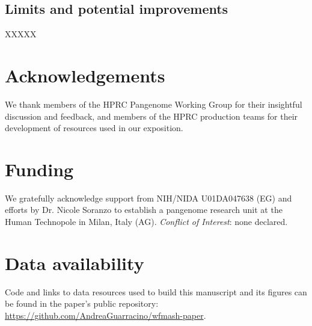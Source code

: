 \documentclass{bioinfo}
\theoremstyle{definition}
\begin{document}
\subsection{Limits and potential improvements}

XXXXX

\section*{Acknowledgements}

We thank members of the HPRC Pangenome Working Group for their insightful discussion and feedback, and members of the HPRC production teams for their development of resources used in our exposition.

\section*{Funding}

We gratefully acknowledge support from NIH/NIDA U01DA047638 (EG) and efforts by Dr. Nicole Soranzo to establish a pangenome research unit at the Human Technopole in Milan, Italy (AG).
\linebreak
\linebreak
\textit{Conflict of Interest}: none declared.

\section*{Data availability}

Code and links to data resources used to build this manuscript and its figures can be found in the paper's public repository: \url{https://github.com/AndreaGuarracino/wfmash-paper}.




\end{document}
